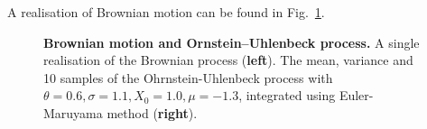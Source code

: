 \noindent
A realisation of Brownian motion can be found in Fig.~\ref{fig:sp-brown}.
\begin{figure}[h]
	\centering
	\caption[Brownian motion and Ornstein–Uhlenbeck process
	]{\textbf{Brownian motion and Ornstein–Uhlenbeck process.} 
		A single realisation of the Brownian process (\textbf{left}). The mean, variance and 10 samples of the Ohrnstein-Uhlenbeck process with $\theta=0.6, \sigma=1.1, X_0=1.0, \mu=-1.3$, integrated using Euler-Maruyama method (\textbf{right}).}
	\label{fig:sp-brown}
\end{figure}

